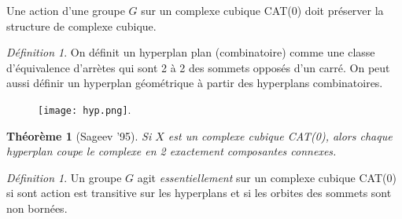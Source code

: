 \documentclass[a4paper]{article}
\newtheorem{thm}[lem]{Théorème}
\theoremstyle{remark}%
\newtheorem{defn}[lem]{Définition}
\begin{document}
Une action d'une groupe $G$ sur un complexe cubique CAT(0) doit préserver la structure de complexe cubique.
%
\begin{defn}
On définit un hyperplan plan (combinatoire) comme une classe d'équivalence d'arrètes qui sont 2 à 2 des sommets opposés d'un carré. On peut aussi définir un hyperplan géométrique à partir des hyperplans combinatoires. 
\end{defn}
%
 \begin{figure}[H]
 \centering
 \texttt{[image: hyp.png]}.
\end{figure}
%
\begin{thm}[Sageev '95]
Si $X$ est un complexe cubique CAT(0), alors chaque hyperplan coupe le complexe en 2 exactement composantes connexes.
\end{thm}
%
\begin{defn}
Un groupe $G$ agit \emph{essentiellement} sur un complexe cubique CAT(0) si sont action est transitive sur les hyperplans et si les orbites des sommets sont non bornées.
\end{defn}
%
%
\end{document}
